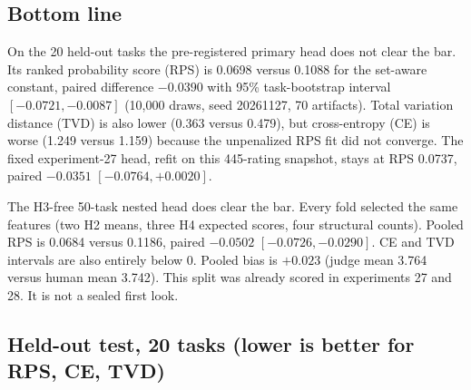 
\subsection*{Bottom line}
On the 20 held-out tasks the pre-registered primary head does not clear the bar. Its ranked probability score (RPS) is 0.0698 versus 0.1088 for the set-aware constant, paired difference $-0.0390$ with 95\% task-bootstrap interval $[-0.0721, -0.0087]$ (10,000 draws, seed 20261127, 70 artifacts). Total variation distance (TVD) is also lower (0.363 versus 0.479), but cross-entropy (CE) is worse (1.249 versus 1.159) because the unpenalized RPS fit did not converge. The fixed experiment-27 head, refit on this 445-rating snapshot, stays at RPS 0.0737, paired $-0.0351$ $[-0.0764, +0.0020]$.

The H3-free 50-task nested head does clear the bar. Every fold selected the same features (two H2 means, three H4 expected scores, four structural counts). Pooled RPS is 0.0684 versus 0.1186, paired $-0.0502$ $[-0.0726, -0.0290]$. CE and TVD intervals are also entirely below 0. Pooled bias is $+0.023$ (judge mean 3.764 versus human mean 3.742). This split was already scored in experiments 27 and 28. It is not a sealed first look.

\subsection*{Held-out test, 20 tasks (lower is better for RPS, CE, TVD)}
\begin{center}\scriptsize\setlength{\tabcolsep}{3pt}
\end{center}

